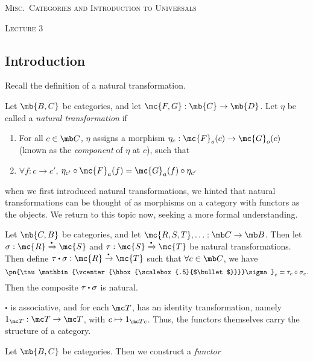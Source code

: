 \documentclass[nocover]{pset}
\newcommand\sbullet[1][.5]{\mathbin{\vcenter{\hbox{\scalebox{#1}{$\bullet$}}}}}
\begin{document}
\begin{center}
  {\scshape \Large Misc.\ Categories and Introduction to Universals}

  {\scshape Lecture 3}
\end{center}
\vspace{-.1cm}
\hrulefill
\begin{adjustwidth}{1em}{1em}
  \section{Introduction}
  Recall the definition of a natural transformation.
  \begin{definition}
    Let $\mb{B,C}$ be categories, and let $\mc{F, G} : \mb{C} \to
    \mb{D}$. Let $\eta$ be called a \emph{natural transformation} if
    \begin{enumerate}[label=\roman*)]
      \item For all $c \in \mb C$, $\eta$ assigns a morphism $\eta_c :
        \mc{F}_o(c) \to \mc{G}_o(c)$ (known as the \emph{component} of
        $\eta$ at $c$), such that
      \item $\forall f: c \to c' $, $\eta_{c'} \circ \mc{F}_a(f) =
        \mc{G}_a(f) \circ \eta_{c'}$
    \end{enumerate}
  \end{definition}
  when we first introduced natural transformations, we hinted that
  natural transformations can be thought of as morphisms on a category
  with functors as the objects. We return to this topic now, seeking a
  more formal understanding.
  \begin{definition}
    Let $\mb{C,B}$ be categories, and let $\mc{R,S,T}, \ldots : \mb C
    \to \mb B$. Then let $\sigma : \mc{R} \xrightarrow{\sbullet} \mc{S}$
    and $\tau : \mc{S} \xrightarrow{\sbullet} \mc{T}$ be natural
    transformations. Then define $\tau \sbullet \sigma : \mc{R}
    \xrightarrow{\sbullet} \mc{T}$ such that $\forall c \in \mb C$, we
    have
    \[
      \pn{\tau \sbullet \sigma}_c = \tau_c \circ \sigma_c.
    \]
    Then the composite $\tau \sbullet \sigma$ is natural.
  \end{definition}
  $\sbullet$ is associative, and for each $\mc T$, has an identity
  transformation, namely $1_{\mc T} : \mc T \to \mc T$, with $c
  \mapsto 1_{\mc T c}$. Thus, the functors themselves carry the
  structure of a category.
  \begin{definition}
    Let $\mb{B,C}$ be categories. Then we construct a \emph{functor
}
\end{definition}
\end{adjustwidth}
\end{document}
